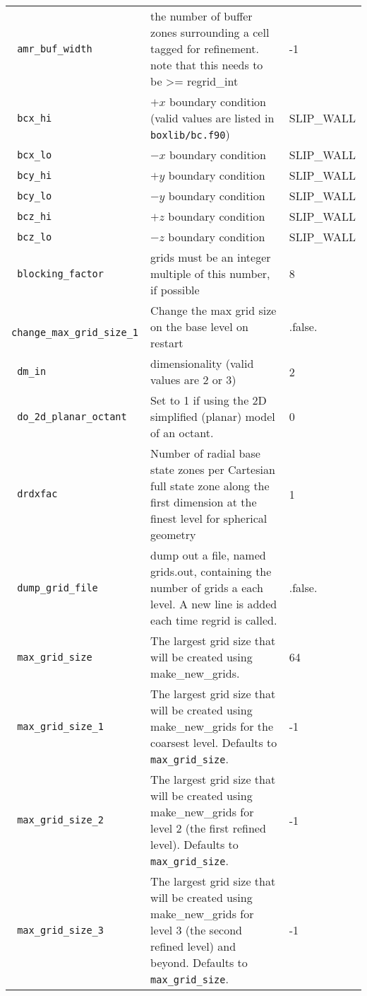 \begin{landscape}
{\begin{center}
\begin{longtable}{|l|p{5.25in}|l|}
\rowcolor{tableShade}
\verb= amr_buf_width = &  the number of buffer zones surrounding a cell tagged for refinement. note that this needs to be >= regrid\_int & -1 \\
\verb= bcx_hi = &  $+x$ boundary condition (valid values are listed in {\tt  boxlib/bc.f90}) & SLIP\_WALL \\
\rowcolor{tableShade}
\verb= bcx_lo = &  $-x$ boundary condition & SLIP\_WALL \\
\verb= bcy_hi = &  $+y$ boundary condition & SLIP\_WALL \\
\rowcolor{tableShade}
\verb= bcy_lo = &  $-y$ boundary condition & SLIP\_WALL \\
\verb= bcz_hi = &  $+z$ boundary condition & SLIP\_WALL \\
\rowcolor{tableShade}
\verb= bcz_lo = &  $-z$ boundary condition & SLIP\_WALL \\
\verb= blocking_factor = &  grids must be an integer multiple of this number, if possible & 8 \\
\rowcolor{tableShade}
\verb= change_max_grid_size_1 = &  Change the max grid size on the base level on restart & .false. \\
\verb= dm_in = &  dimensionality (valid values are 2 or 3) & 2 \\
\rowcolor{tableShade}
\verb= do_2d_planar_octant = &  Set to 1 if using the 2D simplified (planar) model of an octant. & 0 \\
\verb= drdxfac = &  Number of radial base state zones per Cartesian full state zone along the first dimension at the finest level for spherical geometry & 1 \\
\rowcolor{tableShade}
\verb= dump_grid_file = &  dump out a file, named grids.out, containing the number of grids a each level. A new line is added each time regrid is called. & .false. \\
\verb= max_grid_size = &  The largest grid size that will be created using make\_new\_grids. & 64 \\
\rowcolor{tableShade}
\verb= max_grid_size_1 = &  The largest grid size that will be created using make\_new\_grids for the coarsest level.  Defaults to {\tt max\_grid\_size}. & -1 \\
\verb= max_grid_size_2 = &  The largest grid size that will be created using make\_new\_grids for level 2 (the first refined level).  Defaults to {\tt max\_grid\_size}. & -1 \\
\rowcolor{tableShade}
\verb= max_grid_size_3 = &  The largest grid size that will be created using make\_new\_grids for level 3 (the second refined level) and beyond.  Defaults to {\tt max\_grid\_size}. & -1 \\

\end{longtable}
\end{center}}
\end{landscape}
